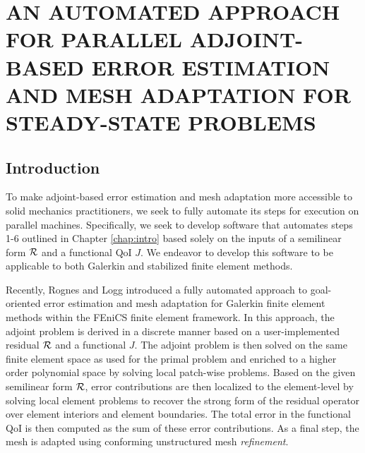 \chapter{AN AUTOMATED APPROACH FOR PARALLEL ADJOINT-BASED
ERROR ESTIMATION AND MESH ADAPTATION FOR STEADY-STATE
PROBLEMS}
\label{chap:automated}

\let\thefootnote\relax{}

\section{Introduction}

To make adjoint-based
error estimation and mesh adaptation more accessible to solid mechanics
practitioners, we seek to fully automate its steps for execution on
parallel machines. Specifically, we seek to
develop software that automates steps 1-6 outlined in Chapter \ref{chap:intro}
based solely on the
inputs of a semilinear form $\mathcal{R}$ and a functional QoI $J$. We endeavor to
develop this software to be applicable to both Galerkin and stabilized
finite element methods.

Recently, Rognes and Logg \cite{rognes2013automated} introduced a fully
automated approach to goal-oriented error estimation and mesh adaptation for
Galerkin finite element methods within the FEniCS \cite{logg2012automated}
finite element framework. In this approach, the adjoint problem is derived
in a discrete manner based on a user-implemented residual $\mathcal{R}$ and a
functional $J$. The adjoint problem is then solved on the same finite element
space as used for the primal problem and enriched to a higher order
polynomial space by solving local patch-wise problems.
Based on the given semilinear form
$\mathcal{R}$, error contributions are then localized to the element-level by solving
local element problems to recover the strong form of the residual operator
over element interiors and element boundaries. The total error in the
functional QoI is then computed as the sum of these error contributions. As a
final step, the mesh is adapted using conforming unstructured mesh
\emph{refinement}.

